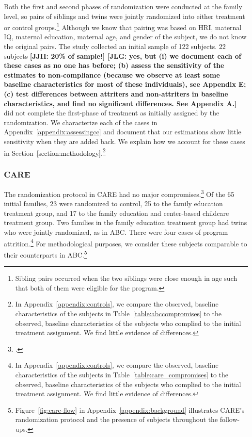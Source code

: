 Both the first and second phases of randomization were conducted at the family level, so pairs of siblings and twins were jointly randomized into either treatment or control groups.\footnote{Sibling pairs occurred when the two siblings were close enough in age such that both of them were eligible for the program.} Although we know that pairing was based on HRI, maternal IQ, maternal education, maternal age, and gender of the subject, we do not know the original pairs. The study collected an initial sample of 122 subjects. 22 subjects \textbf{[JJH: 20\% of sample!] [JLG: yes, but (i) we document each of these cases as no one has before; (b) assess the sensitivity of the estimates to non-compliance (because we observe at least some baseline characteristics for most of these individuals), see Appendix E; (c) test differences between attriters and non-attriters in baseline characteristics, and find no significant differences. See Appendix A.]} did not complete the first-phase of treatment as initially assigned by the randomization. We characterize each of the cases in Appendix~\ref{appendix:assessingcc} and document that our estimations show little sensitivity when they are added back. We explain how we account for these cases in Section~\ref{section:methodology}.\footnote{In Appendix~\ref{appendix:controls}, we compare the observed, baseline characteristics of the subjects in Table~\ref{table:abccompromises} to the observed, baseline characteristics of the subjects who complied to the initial treatment assignment. We find little evidence of differences.}

\subsubsection{CARE}

The randomization protocol in CARE had no major compromises.\footnote{\citet{Wasik_Ramey_etal_1990_CD,Burchinal_Campbell_etal_1997_CD}.} Of the 65 initial families, 23 were randomized to control, 25 to the family education treatment group, and 17 to the family education and center-based childcare treatment group. Two families in the family education treatment group had twins who were jointly randomized, as in ABC. There were four cases of program attrition.\footnote{In Appendix~\ref{appendix:controls}, we compare the observed, baseline characteristics of the subjects in Table~\ref{table:care_compromises} to the observed, baseline characteristics of the subjects who complied to the initial treatment assignment. We find little evidence of differences.} For methodological purposes, we consider these subjects comparable to their counterparts in ABC.\footnote{Figure~\ref{fig:care-flow} in Appendix~\ref{appendix:background} illustrates CARE's randomization protocol and the presence of subjects throughout the follow-ups.}

